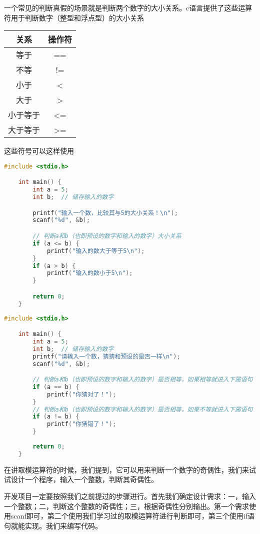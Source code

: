 一个常见的判断真假的场景就是判断两个数字的大小关系。c语言提供了这些运算符用于判断数字（整型和浮点型）的大小关系

\begin{longtable}{c|c}
     关系 & 操作符\\
     \hline
     等于 & ==\\
     \hline
     不等 & !=\\
     \hline
     小于 & <\\
     \hline
     大于 & >\\
     \hline
     小于等于 & <=\\
     \hline
     大于等于 & >=\\
\end{longtable}

这些符号可以这样使用

\begin{lstlisting}[language=C]
    #include <stdio.h>

    int main() {
        int a = 5;
        int b;  // 储存输入的数字

        printf("输入一个数，比较其与5的大小关系！\n");
        scanf("%d", &b);

        // 判断a和b（也即预设的数字和输入的数字）大小关系
        if (a <= b) {
            printf("输入的数大于等于5\n");
        }
        if (a > b) {
            printf("输入的数小于5\n");
        }

        return 0;
    }
\end{lstlisting}

\begin{lstlisting}[language=C]
    #include <stdio.h>

    int main() {
        int a = 5;
        int b;  // 储存输入的数字
        printf("请输入一个数，猜猜和预设的是否一样\n");
        scanf("%d", &b);

        // 判断a和b（也即预设的数字和输入的数字）是否相等，如果相等就进入下属语句
        if (a == b) {
            printf("你猜对了！");
        }
        // 判断a和b（也即预设的数字和输入的数字）是否相等，如果不等就进入下属语句
        if (a != b) {
            printf("你猜错了！");
        }
        
        return 0;
    }
\end{lstlisting}

在讲取模运算符的时候，我们提到，它可以用来判断一个数字的奇偶性，我们来试试设计一个程序，输入一个整数，判断其奇偶性。

开发项目一定要按照我们之前提过的步骤进行。首先我们确定设计需求：一，输入一个整数；二，判断这个整数的奇偶性；三，根据奇偶性分别输出。第一个需求使用scanf即可，第二个使用我们学习过的取模运算符进行判断即可，第三个使用if语句就能实现。我们来编写代码。

